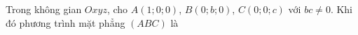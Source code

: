 \begin{ex}
Trong không gian $Oxyz$, cho $A(1;0;0)$, $B(0;b;0)$, $C(0;0;c)$ với $bc\ne0$. Khi đó phương trình mặt phẳng $(ABC)$ là
\end{ex}
